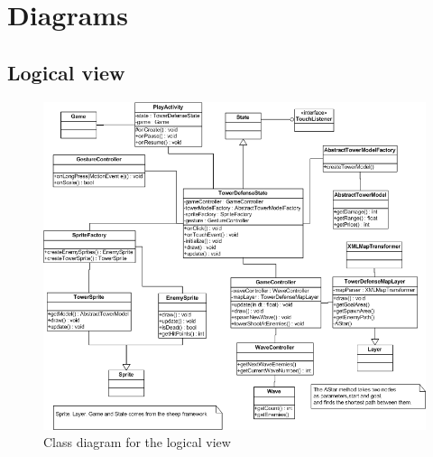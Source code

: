 \documentclass[a4paper, 11pt]{article}
\begin{document}
\clearpage
\appendix
\section{Diagrams}
\subsection{Logical view}
\begin{figure}[h!]
  \center
  \includegraphics[width=1\linewidth ]{images/tdclassdiagram} 
  \caption{Class diagram for the logical view}
  \label{fig:tdtowerdefense}
\end{figure}
\clearpage
\end{document}
